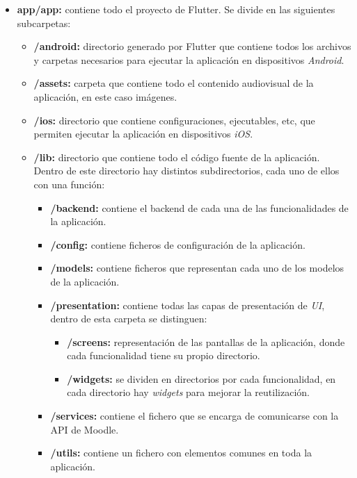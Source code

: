 \begin{itemize}
    \item \textbf{app/app:} contiene todo el proyecto de Flutter. Se divide en las siguientes subcarpetas:
        \begin{itemize}
            \item \textbf{/android:} directorio generado por Flutter que contiene todos los archivos y carpetas necesarios para ejecutar la aplicación en dispositivos \textit{Android}.
            \item \textbf{/assets:} carpeta que contiene todo el contenido audiovisual de la aplicación, en este caso imágenes.
            \item \textbf{/ios:} directorio que contiene configuraciones, ejecutables, etc, que permiten ejecutar la aplicación en dispositivos \textit{iOS}.
            \item \textbf{/lib:} directorio que contiene todo el código fuente de la aplicación. Dentro de este directorio hay distintos subdirectorios, cada uno de ellos con una función:
            \begin{itemize}
                \item \textbf{/backend:} contiene el backend de cada una de las funcionalidades de la aplicación.
                \item \textbf{/config:} contiene ficheros de configuración de la aplicación.
                \item \textbf{/models:} contiene ficheros que representan cada uno de los modelos de la aplicación.
                \item \textbf{/presentation:} contiene todas las capas de presentación de \textit{UI}, dentro de esta carpeta se distinguen:
                    \begin{itemize}
                        \item \textbf{/screens:} representación de las pantallas de la aplicación, donde cada funcionalidad tiene su propio directorio.
                        \item \textbf{/widgets:} se dividen en directorios por cada funcionalidad, en cada directorio hay \textit{widgets} para mejorar la reutilización.
                    \end{itemize}
                \item \textbf{/services:} contiene el fichero que se encarga de comunicarse con la API de Moodle.
                \item \textbf{/utils:} contiene un fichero con elementos comunes en toda la aplicación.

\end{itemize}
\end{itemize}
\end{itemize}
